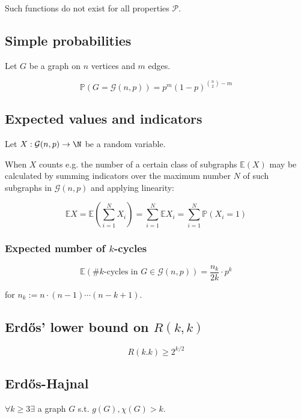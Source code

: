 Such functions do not exist for all properties $\mathcal{P}$.

\subsection*{Simple probabilities}

Let $G$ be a graph on $n$ vertices and $m$ edges.

\vspace*{-2mm}
\[ \mathbb{P}(G = \mathcal{G}(n,p)) = p^m (1-p)^{{n \choose 2}-m} \]

\subsection*{Expected values and indicators}

Let $X : \mathcal{G}(n,p) \to \N$ be a random variable.

When $X$ counts e.g. the number of a certain class of subgraphs $\mathbb{E}(X)$ may be calculated by summing indicators over the maximum number $N$ of such subgraphs in $\mathcal{G}(n,p)$ and applying linearity:

\vspace*{-4mm}
\[ \mathbb{E}X = \mathbb{E}\left(\sum_{i=1}^N X_i\right) = \sum_{i=1}^N \mathbb{E}X_i = \sum_{i=1}^N \mathbb{P}(X_i=1) \]

\subsubsection*{Expected number of $k$-cycles}

\[ \mathbb{E}(\#k\text{-cycles in } G \in \mathcal{G}(n,p)) = \frac{n_k}{2k} \cdot p^k \]

for $n_k := n \cdot (n-1) \cdots (n-k+1)$.

\subsection*{Erd\H{o}s' lower bound on $R(k,k)$}

\[ R(k.k) \geq 2^{k/2} \]

\subsection*{Erd\H{o}s-Hajnal}

$\forall k \geq 3 \exists$ a graph $G$ s.t. $g(G), \chi(G) > k$.

